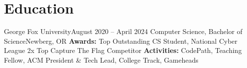 \section{Education}
  \resumeSubHeadingListStart
    \resumeEducationSubheading
        {George Fox University}{August 2020 -- April 2024}
        {Computer Science, Bachelor of Science}{Newberg, OR}
        {\textbf{Awards:} Top Outstanding CS Student, National Cyber League 2x Top Capture The Flag Competitor}
        {\textbf{Activities:} CodePath, Teaching Fellow, ACM President \& Tech Lead, College Track, Gameheads}
  \resumeSubHeadingListEnd


